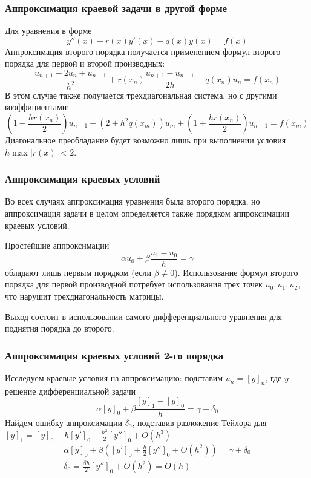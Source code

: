 \documentclass[professionalfonts,compress,unicode,aspectratio=169]{beamer}
\begin{document}
\begin{frame}\frametitle{Аппроксимация краевой задачи в другой форме}
	Для уравнения в форме
	\[
	y''(x) + r(x) y'(x) - q(x)y(x) = f(x)
	\]
	Аппроксимация второго порядка получается применением формул второго порядка
	для первой и второй производных:
	\[
	\frac{u_{n+1} - 2u_{n} + u_{n-1}}{h^2} + r(x_n) \frac{u_{n+1} - u_{n-1}}{2h}
	-q(x_n) u_n = f(x_n)
	\]
	В этом случае также получается трехдиагональная система, но с другими
	коэффициентами:
	\[
	\left(1 - \frac{hr(x_n)}{2}\right) u_{n-1}
	-\left(2 + h^2q(x_m)\right)u_m
	+\left(1 + \frac{hr(x_n)}{2}\right) u_{n+1} = f(x_m)
	\]
	Диагональное преобладание будет возможно лишь при выполнении условия $h
	\max|r(x)| < 2$.
\end{frame}

\begin{frame}\frametitle{Аппроксимация краевых условий}
	Во всех случаях аппроксимация уравнения была второго порядка, но
	аппроксимация задачи в целом определяется также порядком аппроксимации
	краевых условий.

	Простейшие аппроксимации
	\[
	\alpha u_0 + \beta \frac{u_1 - u_0}{h} = \gamma
	\]
	обладают лишь первым порядком (если $\beta \neq 0$). Использование формул второго порядка для
	первой производной потребует использования трех точек $u_0, u_1, u_2$, что
	нарушит трехдиагональность матрицы.

	Выход состоит в использовании самого дифференциального уравнения для
	поднятия порядка до второго.
\end{frame}

\begin{frame}\frametitle{Аппроксимация краевых условий 2-го порядка}
	Исследуем краевые условия на аппроксимацию: подставим $u_n = [y]_n$, где $y$
	--- решение дифференциальной задачи
	\[
	\alpha[y]_0 + \beta\frac{[y]_1 - [y]_0}{h} = \gamma + \delta_0
	\]
	Найдем ошибку аппроксимации $\delta_0$, подставив разложение Тейлора для
	$[y]_1 = [y]_0 + h[y']_0 + \frac{h^2}{2}[y'']_0 + O(h^3)$
	\begin{gather*}
	\alpha[y]_0 + \beta\left([y']_0 + \frac{h}{2}[y'']_0 + O(h^2)\right) =
	\gamma + \delta_0\\
	\delta_0 = \frac{\beta h}{2}[y'']_0 + O(h^2) = O(h)
	\end{gather*}
\end{frame}
\end{document}
